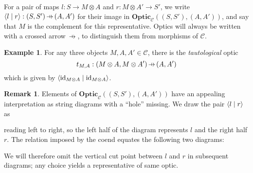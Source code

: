 \documentclass[11pt,a4paper]{article}
\theoremstyle{plain}
\theoremstyle{definition}
\newtheorem{example}[theorem]{Example}
\newtheorem{remark}[theorem]{Remark}
\newcommand{\C}{\mathscr{C}}
\newcommand{\Optic}{\mathbf{Optic}}
\newcommand{\id}{\mathrm{id}}
\newcommand{\rep}[2]{{\ensuremath \left\langle #1 \mid #2 \right\rangle}}
\newcommand{\hto}{\ensuremath{\,\mathaccent\shortmid\rightarrow\,}}
\begin{document}
For a pair of maps $l : S \to M \otimes A$ and $r : M \otimes A' \to S'$, we write $\rep{l}{r} : (S, S') \hto (A, A')$ for their image in $\Optic_\C((S, S'), (A, A'))$, and say that $M$ is the complement for this representative. Optics will always be written with a crossed arrow $\hto$, to distinguish them from morphisms of $\C$.

\begin{example}
  For any three objects $M, A, A' \in \C$, there is the \emph{tautological} optic \[t_{M,A} : (M \otimes A, M \otimes A') \hto (A, A')\] which is given by $\rep{\id_{M \otimes A}}{\id_{M \otimes A}}$.
\end{example}

\begin{remark}
  Elements of $\Optic_\C((S, S'), (A, A'))$ have an appealing
  interpretation as string diagrams with a ``hole'' missing. We draw the
  pair $\rep{l}{r}$ as
  \begin{center}
    
  \end{center}
  reading left to right, so the left half of the diagram represents $l$ and the right half $r$. The relation imposed by the coend equates the following two diagrams:
  \begin{center}
    
    \qquad
    
  \end{center}
  We will therefore omit the vertical cut point between $l$ and $r$ in subsequent diagrams; any choice yields a representative of same optic.
\end{remark}
\end{document}
